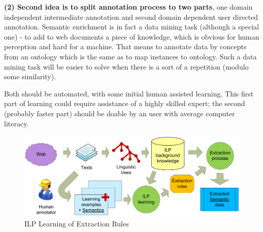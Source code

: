 \documentclass{www2009-submission}
\begin{document}




\textbf{(2) Second idea is to split annotation process to two parts}, one domain independent intermediate annotation and second domain dependent user directed annotation. Semantic enrichment is in fact a data mining task (although a special one) - to add to web documents a piece of knowledge, which is obvious for human perception and hard for a machine. That means to annotate data by concepts from an ontology which is the same as to map instances to ontology. Such a data mining task will be easier to solve when there is a sort of a repetition (modulo some similarity).\par 
Both should be automated, with some initial human assisted learning. This first part of learning could require assistance of a highly skilled expert; the second (probably faster part) should be doable by an user with average computer literacy. \par



\begin{figure}[b!]
\centering
\includegraphics[width=\hsize]{img/DedVoj_ILP}
\caption{ILP Learning of Extraction Rules}
\label{img:DedVoj_ILP}
\end{figure}
\end{document}
